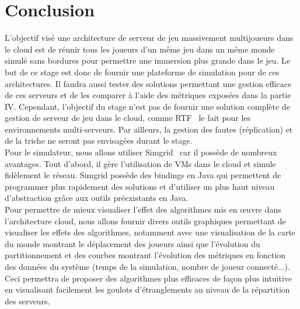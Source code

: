 \section{Conclusion}
L'objectif visé une architecture de serveur de jeu massivement multijoueurs dans le cloud est de réunir tous les joueurs d'un même jeu dans un même monde simulé sans bordures pour permettre une immersion plus grande dans le jeu. Le but de ce stage est donc de fournir une plateforme de simulation pour de ces architectures. Il faudra aussi tester des solutions permettant une gestion efficace de ces serveurs et de les comparer à l'aide des métriques exposées dans la partie IV. Cependant, l'objectif du stage n'est pas de fournir une solution complète de gestion de serveur de jeu dans le cloud, comme RTF~\cite{rtf_middleware_development} le fait pour les environnements multi-serveurs. Par ailleurs, la gestion des fautes (réplication) et de la triche ne seront pas envisagées durant le stage.\\

Pour le simulateur, nous allons utiliser Simgrid~\cite{simgrid} car il possède de nombreux avantages. Tout d'abord, il gère l'utilisation de VMs dans le cloud et simule fidèlement le réseau. Simgrid possède des bindings en Java qui permettent de programmer plus rapidement des solutions et d'utiliser un plus haut niveau d'abstraction grâce aux outils préexistants en Java.\\

Pour permettre de mieux visualiser l'effet des algorithmes mis en \oe{}uvre dans l'architecture cloud, nous allons fournir divers outils graphiques permettant de visualiser les effets des algorithmes, notamment avec une visualisation de la carte du monde montrant le déplacement des joueurs ainsi que l'évolution du partitionnement et des courbes montrant l'évolution des métriques en fonction des données du système (temps de la simulation, nombre de joueur connecté...). Ceci permettra de proposer des algorithmes plus efficaces de façon plus intuitive en visualisant facilement les goulots d'étranglements au niveau de la répartition des serveurs.
